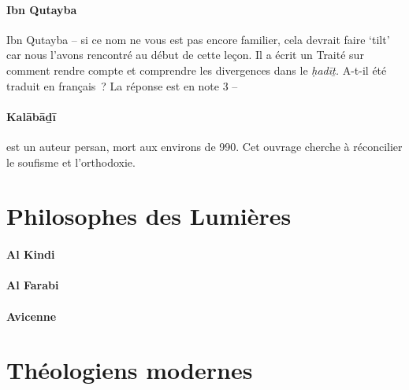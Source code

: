 \paragraph{Ibn Qutayba}
Ibn Qutayba -- si ce nom ne vous est pas encore familier, cela devrait
faire `tilt' car nous l'avons rencontré au début de cette leçon. Il a
écrit un Traité sur comment rendre compte et comprendre les divergences
dans le \emph{ḥadīṯ.} A-t-il été traduit en français~? La réponse est en
note 3 --
\pageref{Theol:IbnQutayba1}
\paragraph{Kalābāḏī}
  est un auteur persan, mort aux environs de 990. Cet ouvrage
cherche à réconcilier le soufisme et l'orthodoxie. 
\pageref{theol:Kalabadi}




\section{Philosophes des Lumières}
\paragraph{Al Kindi}  
\paragraph{Al Farabi}
\paragraph{Avicenne}




\section{Théologiens modernes}

